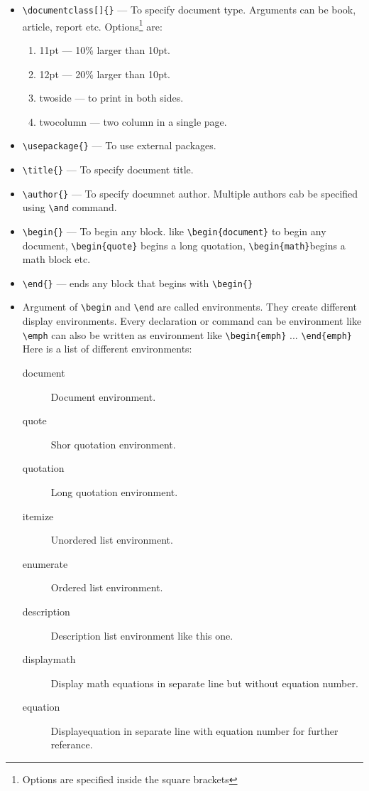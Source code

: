 \documentclass[11pt]{article}
\begin{document}
\begin{itemize}
		\item\verb=\documentclass[]{}= --- To specify document type. Arguments can be book, article, report etc. Options\footnote{Options are specified inside the square brackets} are:

		\begin{enumerate}
			\item 11pt --- 10\% larger than 10pt.
			\item 12pt --- 20\% larger than 10pt.
			\item twoside --- to print in both sides.
			\item twocolumn --- two column in a single page.
		\end{enumerate}

		\item\verb=\usepackage{}= --- To use external packages.
		\item\verb=\title{}= --- To specify document title.
		\item\verb=\author{}= --- To specify documnet author. Multiple authors cab be specified using \verb=\and= command.
		\item\verb=\begin{}= --- To begin any block. like \verb=\begin{document}= to begin any document, \verb=\begin{quote}= begins a long quotation, \verb=\begin{math}=begins a math block etc.
		\item\verb=\end{}= --- ends any block that begins with \verb=\begin{}=
				\item Argument of \verb=\begin= and \verb=\end= are called environments. They create different display environments. Every declaration or command can be environment like \verb=\emph= can also be written as environment like \verb=\begin{emph}= ... \verb=\end{emph}= Here is a list of different environments:

			\begin{description}
				\item[document] Document environment.
				\item[quote] Shor quotation environment.
				\item[quotation] Long quotation environment.
				\item[itemize] Unordered list environment.
				\item[enumerate] Ordered list environment.
				\item[description] Description list environment like this one.
				\item[displaymath] Display math equations in separate line but without equation number.
				\item[equation] Displayequation in separate line with equation number for further referance.
			\end{description}


\end{itemize}
\end{document}
